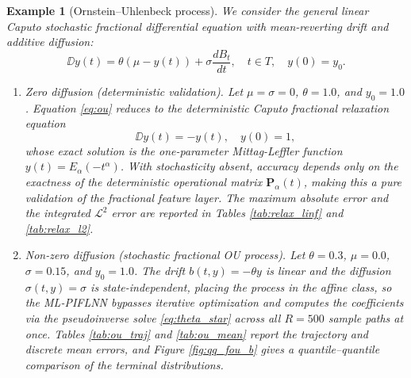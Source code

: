 \documentclass[11pt, a4paper]{article}
\theoremstyle{theoremstyle}
\theoremstyle{definitionstyle}
\newtheorem{example}[theorem]{Example}
\newcommand{\sdv}{\frac{dB_t}{dt}}
\begin{document}
\begin{example}[Ornstein--Uhlenbeck process]\label{ex:ou}
    We consider the general linear Caputo stochastic fractional differential equation with mean-reverting drift and additive diffusion:
    \begin{equation}\label{eq:ou}
        \DD y(t) = \theta(\mu - y(t)) + \sigma \sdv, \quad t \in T, \quad y(0) = y_0.
    \end{equation}

    \begin{enumerate}[label=(\roman*)]
        \item \emph{Zero diffusion (deterministic validation).} Let $\mu = \sigma = 0$, $\theta = 1.0$, and $y_0 = 1.0$. Equation \eqref{eq:ou} reduces to the deterministic Caputo fractional relaxation equation
        \begin{equation}\label{eq:relaxation}
            \DD y(t) = -y(t), \quad y(0) = 1,
        \end{equation}
        whose exact solution is the one-parameter Mittag-Leffler function $y(t) = E_\alpha(-t^\alpha)$. With stochasticity absent, accuracy depends only on the exactness of the deterministic operational matrix $\mathbf P_\alpha(t)$, making this a pure validation of the fractional feature layer. The maximum absolute error and the integrated $\mathcal L^2$ error are reported in Tables \ref{tab:relax_linf} and \ref{tab:relax_l2}.

        \item \emph{Non-zero diffusion (stochastic fractional OU process).} Let $\theta = 0.3$, $\mu = 0.0$, $\sigma = 0.15$, and $y_0 = 1.0$. The drift $b(t, y) = -\theta y$ is linear and the diffusion $\sigma(t, y) = \sigma$ is state-independent, placing the process in the affine class, so the ML-PIFLNN bypasses iterative optimization and computes the coefficients via the pseudoinverse solve \eqref{eq:theta_star} across all $R = 500$ sample paths at once. Tables \ref{tab:ou_traj} and \ref{tab:ou_mean} report the trajectory and discrete mean errors, and Figure \ref{fig:qq_fou_b} gives a quantile--quantile comparison of the terminal distributions.
    \end{enumerate}
\end{example}
\end{document}
